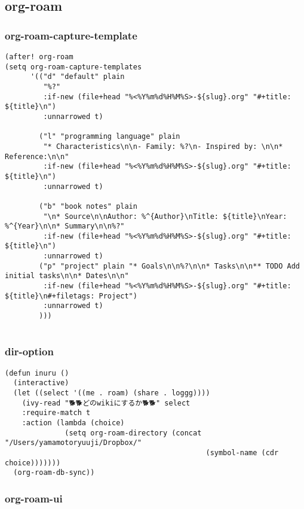 \documentclass[11pt]{article}
\begin{document}
\subsection{org-roam}
\label{sec:org405d58c}
\subsubsection{org-roam-capture-template}
\label{sec:org5a94213}
\begin{verbatim}
(after! org-roam
(setq org-roam-capture-templates
      '(("d" "default" plain
         "%?"
         :if-new (file+head "%<%Y%m%d%H%M%S>-${slug}.org" "#+title: ${title}\n")
         :unnarrowed t)

        ("l" "programming language" plain
         "* Characteristics\n\n- Family: %?\n- Inspired by: \n\n* Reference:\n\n"
         :if-new (file+head "%<%Y%m%d%H%M%S>-${slug}.org" "#+title: ${title}\n")
         :unnarrowed t)

        ("b" "book notes" plain
         "\n* Source\n\nAuthor: %^{Author}\nTitle: ${title}\nYear: %^{Year}\n\n* Summary\n\n%?"
         :if-new (file+head "%<%Y%m%d%H%M%S>-${slug}.org" "#+title: ${title}\n")
         :unnarrowed t)
        ("p" "project" plain "* Goals\n\n%?\n\n* Tasks\n\n** TODO Add initial tasks\n\n* Dates\n\n"
         :if-new (file+head "%<%Y%m%d%H%M%S>-${slug}.org" "#+title: ${title}\n#+filetags: Project")
         :unnarrowed t)
        )))


\end{verbatim}
\subsubsection{dir-option}
\label{sec:org87cb316}
\begin{verbatim}
(defun inuru ()
  (interactive)
  (let ((select '((me . roam) (share . loggg))))
    (ivy-read "🐕🐕どのwikiにするか🐕🐕" select
    :require-match t
    :action (lambda (choice)
              (setq org-roam-directory (concat "/Users/yamamotoryuuji/Dropbox/"
                                               (symbol-name (cdr choice)))))))
  (org-roam-db-sync))
\end{verbatim}

\subsubsection{org-roam-ui}
\label{sec:orgc6404dc}
\end{document}
